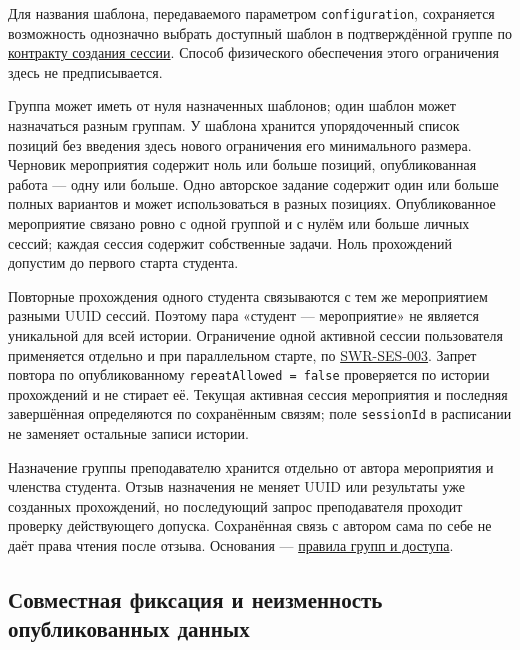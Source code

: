 \documentclass[12pt,a4paper]{article}
\begin{document}
Для названия шаблона, передаваемого параметром \texttt{configuration}, сохраняется возможность однозначно выбрать доступный шаблон в подтверждённой группе по {\href{../09\_Архитектура\_и\_API/DOC-08\_Справочник\_API.pdf\#1-создание-сессии}{контракту создания сессии}}. Способ физического обеспечения этого ограничения здесь не предписывается.

Группа может иметь от нуля назначенных шаблонов; один шаблон может назначаться разным группам. У шаблона хранится упорядоченный список позиций без введения здесь нового ограничения его минимального размера. Черновик мероприятия содержит ноль или больше позиций, опубликованная работа --- одну или больше. Одно авторское задание содержит один или больше полных вариантов и может использоваться в разных позициях. Опубликованное мероприятие связано ровно с одной группой и с нулём или больше личных сессий; каждая сессия содержит собственные задачи. Ноль прохождений допустим до первого старта студента.

Повторные прохождения одного студента связываются с тем же мероприятием разными UUID сессий. Поэтому пара «студент --- мероприятие» не является уникальной для всей истории. Ограничение одной активной сессии пользователя применяется отдельно и при параллельном старте, по {\href{DOC-06.2\_Сессии\_задач\_и\_планировщик.pdf\#swr-ses-003}{SWR-SES-003}}. Запрет повтора по опубликованному \texttt{repeat\allowbreak{}Allowed =\allowbreak{} false} проверяется по истории прохождений и не стирает её. Текущая активная сессия мероприятия и последняя завершённая определяются по сохранённым связям; поле \texttt{sessionId} в расписании не заменяет остальные записи истории.

Назначение группы преподавателю хранится отдельно от автора мероприятия и членства студента. Отзыв назначения не меняет UUID или результаты уже созданных прохождений, но последующий запрос преподавателя проходит проверку действующего допуска. Сохранённая связь с автором сама по себе не даёт права чтения после отзыва. Основания --- {\href{../02\_Техническое\_задание/Техническое\_задание.pdf\#правила-доступа-и-прохождения-контрольного-мероприятия}{правила групп и доступа}}.

\subsection{Совместная фиксация и неизменность опубликованных данных}\label{ux441ux43eux432ux43cux435ux441ux442ux43dux430ux44f-ux444ux438ux43aux441ux430ux446ux438ux44f-ux438-ux43dux435ux438ux437ux43cux435ux43dux43dux43eux441ux442ux44c-ux43eux43fux443ux431ux43bux438ux43aux43eux432ux430ux43dux43dux44bux445-ux434ux430ux43dux43dux44bux445}
\end{document}
